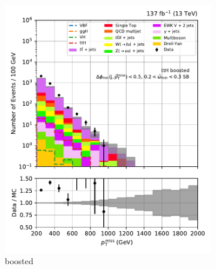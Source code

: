 \begin{figure}[htbp]
    \centering
    \begin{subfigure}[b]{0.24\textwidth}
        \includegraphics[width=\textwidth]{figures/region_plots/full_Run2/sideband_1/ttH_boosted.pdf}
        \caption{\ttH boosted}
    \end{subfigure}
    \hfill
    \begin{subfigure}[b]{0.24\textwidth}

\end{subfigure}
\end{figure}
